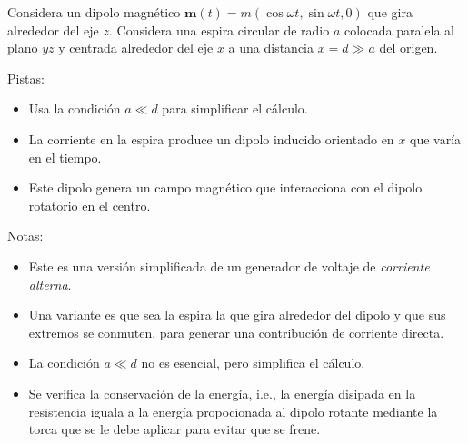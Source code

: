 \documentclass{exam}
\begin{document}
\begin{questions}
    \question Considera un dipolo magnético $\bm m(t)=m(\cos\omega t,
    \sin\omega t,0)$ que gira alrededor del eje $z$. Considera una
    espira circular de radio $a$ colocada paralela al plano $yz$ y
    centrada alrededor del eje $x$ a una distancia $x=d\gg a$ del origen.

    Pistas:
    \begin{itemize}
    \item Usa la condición $a\ll d$ para simplificar el cálculo.
    \item La corriente en la espira produce un dipolo inducido orientado en $x$
      que varía en el tiempo.
    \item Este dipolo genera un campo magnético que interacciona con
      el dipolo rotatorio en el centro.
    \end{itemize}
    Notas:
    \begin{itemize}
    \item Este es una versión simplificada de un generador de voltaje
      de {\em corriente alterna}.
    \item Una variante es que sea la espira la que gira alrededor del
      dipolo y que sus extremos se conmuten, para generar una
      contribución de corriente directa.
    \item La condición $a\ll d$ no es esencial, pero simplifica el
      cálculo.
    \item Se verifica la conservación de la energía, i.e., la energía
      disipada en la resistencia iguala a la energía propocionada al
      dipolo rotante mediante la torca que se le debe aplicar para
      evitar que se frene.
    \end{itemize}


\end{questions}
\end{document}
